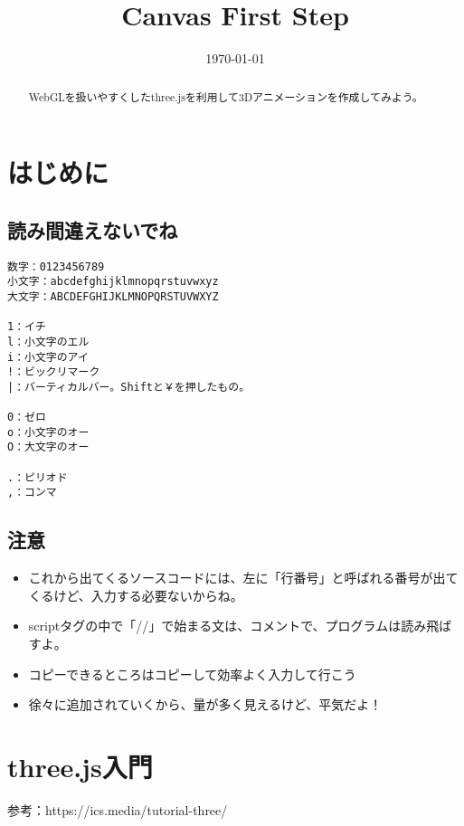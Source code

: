 \documentclass[mingoth,11pt,a4j,uplatex]{jsarticle}
\title{Canvas First Step}
\date{\today}
\begin{document}

\maketitle

\begin{abstract}
WebGLを扱いやすくしたthree.jsを利用して3Dアニメーションを作成してみよう。
\end{abstract}

\tableofcontents
\newpage

\section{はじめに}
\subsection{読み間違えないでね}

\begin{lstlisting}[caption=読み間違えないでね]
数字：0123456789
小文字：abcdefghijklmnopqrstuvwxyz
大文字：ABCDEFGHIJKLMNOPQRSTUVWXYZ

1：イチ
l：小文字のエル
i：小文字のアイ
!：ビックリマーク
|：バーティカルバー。Shiftと￥を押したもの。

0：ゼロ
o：小文字のオー
O：大文字のオー

.：ピリオド
,：コンマ
\end{lstlisting}

\subsection{注意}
\begin{itemize}
\item これから出てくるソースコードには、左に「行番号」と呼ばれる番号が出てくるけど、入力する必要ないからね。

\item scriptタグの中で「//」で始まる文は、コメントで、プログラムは読み飛ばすよ。

\item コピーできるところはコピーして効率よく入力して行こう
\item 徐々に追加されていくから、量が多く見えるけど、平気だよ！
\end{itemize}


\newpage
\section{three.js入門}
参考：https://ics.media/tutorial-three/
\end{document}
